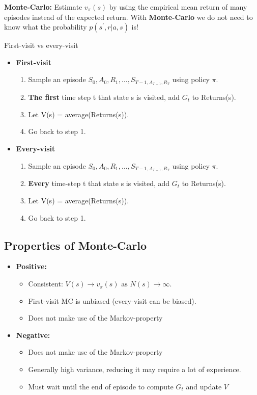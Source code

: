 \textbf{Monte-Carlo: } Estimate $v_\pi(s)$ by using the empirical mean return of many episodes instead of the expected return. With \textbf{Monte-Carlo} we do not need to know what the probability $p(s^{\prime},r|a,s)$ is!

\begin{wbox}{First-visit vs every-visit}
\begin{itemize}
	\item \textbf{First-visit}
		\begin{enumerate}
			\item Sample an episode $S_0,A_0,R_1,\ldots,S_{T-1, A_{T-1},R_T}$ using policy $\pi$.
			\item \textbf{The first} time step t that state s is visited, add $G_t$ to Returns(s).
			\item Let V(s) = average(Returns(s)).
			\item Go back to step 1.
		\end{enumerate}
	\item \textbf{Every-visit}
		\begin{enumerate}
			\item Sample an episode $S_0,A_0,R_1,\ldots,S_{T-1, A_{T-1},R_T}$ using policy $\pi$.
			\item \textbf{Every} time-step t that state s is visited, add $G_t$ to Returns(s).
			\item Let V(s) = average(Returns(s)).
			\item Go back to step 1.
		\end{enumerate}
\end{itemize}
\end{wbox}


\subsection{Properties of Monte-Carlo}
\begin{itemize}
	\item \textbf{Positive: }
		\begin{itemize}
			\item Consistent: $V(s) \rightarrow v_\pi(s) \text{ as } N(s) \rightarrow \infty$.
			\item First-visit MC is unbiased (every-visit can be biased).
			\item Does not make use of the Markov-property
		\end{itemize}
	\item \textbf{Negative: }
	\begin{itemize}
		\item Does not make use of the Markov-property
		\item Generally high variance, reducing it may require a lot of experience.
		\item Must wait until the end of episode to compute $G_t$ and update $V$
	\end{itemize}
\end{itemize}

